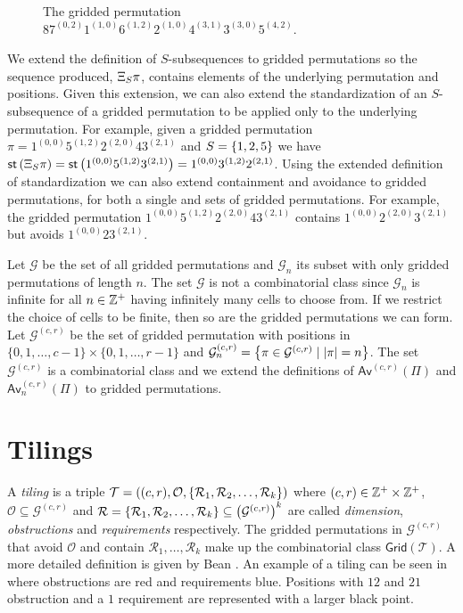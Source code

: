 \begin{figure}[ht!]
    \centering
    
    \caption{The gridded permutation $87^{(0,2)}1^{(1,0)}6^{(1,2)}2^{(1,0)}4^{(3,1)}3^{(3,0)}5^{(4,2)}$.}
    \label{fig:gridded_perm}
\end{figure}

We extend the definition of $S$-subsequences to gridded permutations so the sequence produced, $\Xi_{S}\pi$, contains elements of the underlying permutation and positions. Given this extension, we can also extend the standardization of an $S$-subsequence of a gridded permutation to be applied only to the underlying permutation. For example, given a gridded permutation $\pi = 1^{(0,0)}5^{(1,2)}2^{(2,0)}43^{(2,1)}$ and $S=\left\{1,2,5\right\}$ we have $\textsf{st}\left(\Xi_{S}\pi\right) = \textsf{st}\left(1^{(0,0)}5^{(1,2)}3^{(2,1)}\right) = 1^{(0,0)}3^{(1,2)}2^{(2,1)}$. Using the extended definition of standardization we can also extend containment and avoidance to gridded permutations, for both a single and sets of gridded permutations. For example, the gridded permutation $1^{(0,0)}5^{(1,2)}2^{(2,0)}43^{(2,1)}$ contains $1^{(0,0)}2^{(2,0)}3^{(2,1)}$ but avoids $1^{(0,0)}23^{(2,1)}$.

Let $\mathcal{G}$ be the set of all gridded permutations and $\mathcal{G}_n$ its subset with only gridded permutations of length $n$. The set $\mathcal{G}$ is not a combinatorial class since $\mathcal{G}_n$ is infinite for all $n \in \mathbb{Z}^+$ having infinitely many cells to choose from. If we restrict the choice of cells to be finite, then so are the gridded permutations we can form. Let $\mathcal{G}^{(c,r)}$ be the set of gridded permutation with positions in $\{0,1,\dotsc,c-1\} \times \{0,1,\dotsc,r-1\}$ and $\mathcal{G}^{(c,r)}_n = \left\{\pi \in \mathcal{G}^{(c,r)} \mid |\pi| = n\right\}$. The set $\mathcal{G}^{(c,r)}$ is a combinatorial class and we extend the definitions of $\textsf{Av}^{(c,r)}\left(\Pi\right)$ and $\textsf{Av}_n^{(c,r)}\left(\Pi\right)$ to gridded permutations.

\section{Tilings\label{sec:tilings}}
A \emph{tiling} is a triple $\mathcal{T} = ((c,r), \mathcal{O}, \left\{\mathcal{R}_1,\mathcal{R}_2,\dotsc,\mathcal{R}_k\right\})$ where $(c,r) \in \mathbb{Z}^+ \times \mathbb{Z}^+$, $\mathcal{O} \subseteq \mathcal{G}^{(c,r)}$ and $\mathcal{R}=\left\{\mathcal{R}_1,\mathcal{R}_2,\dotsc,\mathcal{R}_k\right\} \subseteq \left(\mathcal{G}^{(c,r)}\right)^k$ are called \emph{dimension}, \emph{obstructions} and \emph{requirements} respectively. The gridded permutations in $\mathcal{G}^{(c,r)}$ that avoid $\mathcal{O}$ and contain $\mathcal{R}_1,\dotsc,\mathcal{R}_k$ make up the combinatorial class $\textsf{Grid}(\mathcal{T})$. A more detailed definition is given by Bean \cite{BeanPhd:phd}. An example of a tiling can be seen in  where obstructions are red and requirements blue. Positions with $12$ and $21$ obstruction and a $1$ requirement are represented with a larger black point. 

